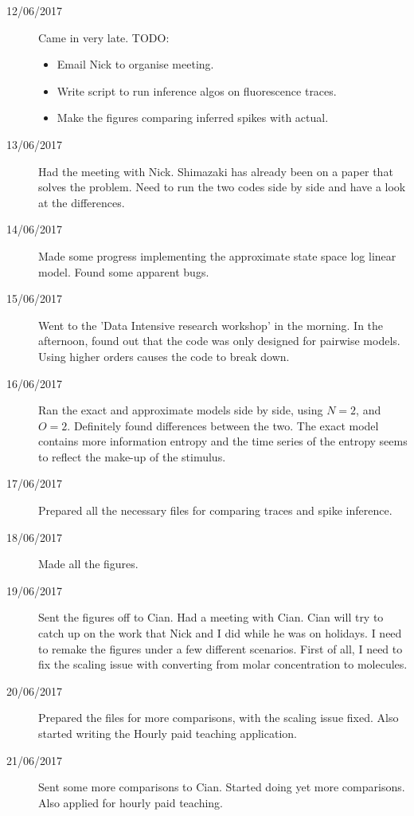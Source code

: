\documentclass[a4paper,12pt]{article}
\theoremstyle{definition}
\begin{document}
\begin{description}
	\item[12/06/2017] Came in very late. TODO:
	\begin{itemize}
		\item Email Nick to organise meeting.
		\item Write script to run inference algos on fluorescence traces.
		\item Make the figures comparing inferred spikes with actual.
	\end{itemize}

	\item[13/06/2017] Had the meeting with Nick. Shimazaki has already been on a paper that solves the problem. Need to run the two codes side by side and have a look at the differences.

	\item[14/06/2017] Made some progress implementing the approximate state space log linear model. Found some apparent bugs.

	\item[15/06/2017] Went to the 'Data Intensive research workshop' in the morning. In the afternoon, found out that the code was only designed for pairwise models. Using higher orders causes the code to break down.

	\item[16/06/2017] Ran the exact and approximate models side by side, using $N=2$, and $O=2$. Definitely found differences between the two. The exact model contains more information entropy and the time series of the entropy seems to reflect the make-up of the stimulus.

	\item[17/06/2017] Prepared all the necessary files for comparing traces and spike inference.

	\item[18/06/2017] Made all the figures.

	\item[19/06/2017] Sent the figures off to Cian. Had a meeting with Cian. Cian will try to catch up on the work that Nick and I did while he was on holidays. I need to remake the figures under a few different scenarios. First of all, I need to fix the scaling issue with converting from molar concentration to molecules.

	\item[20/06/2017] Prepared the files for more comparisons, with the scaling issue fixed. Also started writing the Hourly paid teaching application.

	\item[21/06/2017] Sent some more comparisons to Cian. Started doing yet more comparisons. Also applied for hourly paid teaching.


\end{description}
\end{document}
